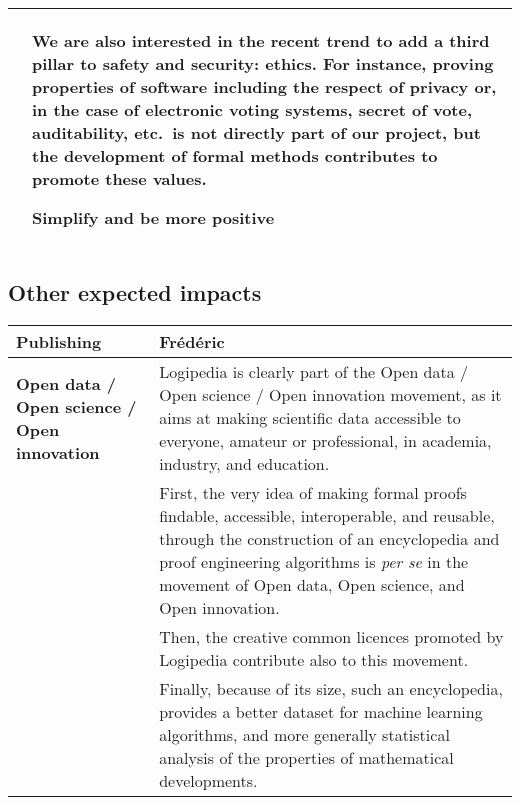 \begin{longtable}{|p{}|p{}|}
&
\hspace{0.4cm} We are also interested in the recent trend to add a
third pillar to safety and security: ethics. For instance, proving
properties of software including the respect of privacy or, in the
case of electronic voting systems, secret of vote, auditability,
etc.~is not directly part of our project, but the development of formal
methods contributes to promote these values.

{\color{red} Simplify and be more positive}\\

\hline
\end{longtable}


\subsection*{Other expected impacts}

\begin{longtable}{|p{}|p{}|}
\hline
{\bf Publishing}
&
{\color{red} Frédéric}\\
\hline
{\bf Open data / Open science / Open innovation}
&
Logipedia is clearly part of the Open data / Open science / Open
innovation movement, as it aims at making scientific data accessible
to everyone, amateur or professional, in academia, industry, and
education.\\
&
\hspace{0.4cm}
First, the very idea of making formal proofs findable, accessible,
interoperable, and reusable, through the construction of an
encyclopedia and proof engineering algorithms is {\em per se} in the
movement of Open data, Open science, and Open innovation.\\
&
\hspace{0.4cm}
Then, the creative common licences promoted by Logipedia contribute
also to this movement.\\
&
\hspace{0.4cm}
Finally, because of its size, such an encyclopedia, provides a better
dataset for machine learning algorithms, and more generally
statistical analysis of the properties of mathematical developments.
\\
\hline
\end{longtable}


